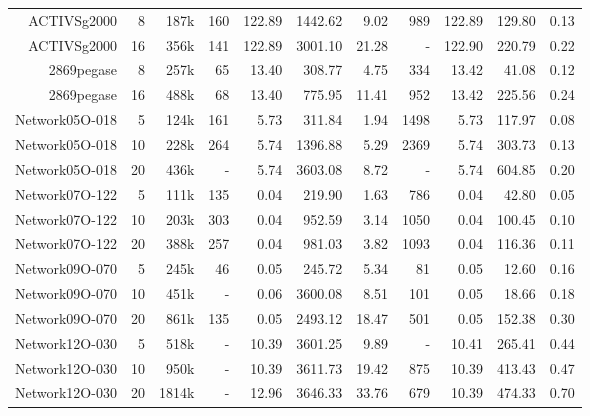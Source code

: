 \documentclass{IEEEtran4PSCC}
\begin{document}
\begin{table}[!ht]
{\begin{tabular}{|rrr|rrrr|rrrr|}
ACTIVSg2000    & 8    & 187k  & 160      & 122.89      & 1442.62 & 9.02  & 989      & 122.89       & 129.80 & 0.13 \\
ACTIVSg2000    & 16   & 356k  & 141      & 122.89      & 3001.10 & 21.28 & -        & 122.90       & 220.79 & 0.22 \\
2869pegase     & 8    & 257k  & 65       & 13.40       & 308.77  & 4.75  & 334      & 13.42        & 41.08  & 0.12 \\
2869pegase     & 16   & 488k  & 68       & 13.40       & 775.95  & 11.41 & 952      & 13.42        & 225.56 & 0.24 \\
\hline
Network05O-018 & 5    & 124k  & 161      & 5.73        & 311.84  & 1.94  & 1498     & 5.73         & 117.97 & 0.08 \\
Network05O-018 & 10   & 228k  & 264      & 5.74        & 1396.88 & 5.29  & 2369     & 5.74         & 303.73 & 0.13 \\
Network05O-018 & 20   & 436k  & -        & 5.74        & 3603.08 & 8.72  & -        & 5.74         & 604.85 & 0.20 \\
Network07O-122 & 5    & 111k  & 135      & 0.04        & 219.90  & 1.63  & 786      & 0.04         & 42.80  & 0.05 \\
Network07O-122 & 10   & 203k  & 303      & 0.04        & 952.59  & 3.14  & 1050     & 0.04         & 100.45 & 0.10 \\
Network07O-122 & 20   & 388k  & 257      & 0.04        & 981.03  & 3.82  & 1093     & 0.04         & 116.36 & 0.11 \\
Network09O-070 & 5    & 245k  & 46       & 0.05        & 245.72  & 5.34  & 81       & 0.05         & 12.60  & 0.16 \\
Network09O-070 & 10   & 451k  & -        & 0.06        & 3600.08 & 8.51  & 101      & 0.05         & 18.66  & 0.18 \\
Network09O-070 & 20   & 861k  & 135      & 0.05        & 2493.12 & 18.47 & 501      & 0.05         & 152.38 & 0.30 \\
Network12O-030 & 5    & 518k  & -        & 10.39       & 3601.25 & 9.89  & -        & 10.41        & 265.41 & 0.44 \\
Network12O-030 & 10   & 950k  & -        & 10.39       & 3611.73 & 19.42 & 875      & 10.39        & 413.43 & 0.47 \\
Network12O-030 & 20   & 1814k & -        & 12.96       & 3646.33 & 33.76 & 679      & 10.39        & 474.33 & 0.70 \\
\hline
\end{tabular}
}
\label{tab:benchmark}
\end{table}
\end{document}
